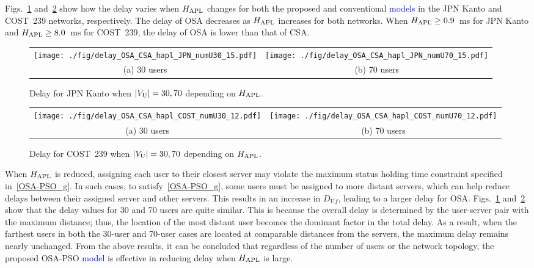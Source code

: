 \documentclass[10pt, letterpaper]{IEEEtran}
\newcommand\blue[1]{\textcolor{blue}{#1}}
\begin{document}
\begin{CJK}{UTF8}{ipxm}
Figs.~\ref{fig:delay_OSA_CSA_hapl_JPN} and~\ref{fig:delay_OSA_CSA_hapl_COST} show how the delay varies when $H_{\rm APL}$ changes for both the proposed and conventional \blue{models} in the JPN Kanto and COST~239 networks, respectively.
The delay of OSA decreases as $H_{\rm APL}$ increases for both networks.
When $H_{\rm APL} \geq 0.9$~ms for JPN Kanto and $H_{\rm APL} \geq 8.0$~ms for COST~239, the delay of OSA is lower than that of CSA.
\begin{figure}[t]
  \begin{center}
      \begin{tabular}{cc}
      \texttt{[image: ./fig/delay\_OSA\_CSA\_hapl\_JPN\_numU30\_15.pdf]} &
      \texttt{[image: ./fig/delay\_OSA\_CSA\_hapl\_JPN\_numU70\_15.pdf]} \\
      (a) 30 users & (b) 70 users
      \end{tabular}
  \end{center}
  \caption{Delay for JPN Kanto when $|V_{\rm U}| = 30, 70$ depending on $H_{\rm APL}$.}
  \label{fig:delay_OSA_CSA_hapl_JPN}
\end{figure}
\begin{figure}[t]
  \begin{center}
      \begin{tabular}{cc}
      \texttt{[image: ./fig/delay\_OSA\_CSA\_hapl\_COST\_numU30\_12.pdf]} &
      \texttt{[image: ./fig/delay\_OSA\_CSA\_hapl\_COST\_numU70\_12.pdf]} \\
      (a) 30 users & (b) 70 users
      \end{tabular}
  \end{center}
  \caption{Delay for COST~239 when $|V_{\rm U}| = 30, 70$ depending on $H_{\rm APL}$.}
  \label{fig:delay_OSA_CSA_hapl_COST}
\end{figure}
When $H_{\rm APL}$ is reduced, assigning each user to their closest server may violate the maximum status holding time constraint specified in~\eqref{OSA-PSO_g}.
In such cases, to satisfy~\eqref{OSA-PSO_g}, some users must be assigned to more distant servers, which can help reduce delays between their assigned server and other servers.
This results in an increase in $D_{\mathrm{U}f}$, leading to a larger delay for OSA.
Figs.~\ref{fig:delay_OSA_CSA_hapl_JPN} and~\ref{fig:delay_OSA_CSA_hapl_COST} show that the delay values for 30 and 70 users are quite similar.
This is because the overall delay is determined by the user-server pair with the maximum distance; thus, the location of the most distant user becomes the dominant factor in the total delay.
As a result, when the farthest users in both the 30-user and 70-user cases are located at comparable distances from the servers, the maximum delay remains nearly unchanged.
From the above results, it can be concluded that regardless of the number of users or the network topology, the proposed OSA-PSO \blue{model} is effective in reducing delay when $H_{\rm APL}$ is large.


\end{CJK}
\end{document}
